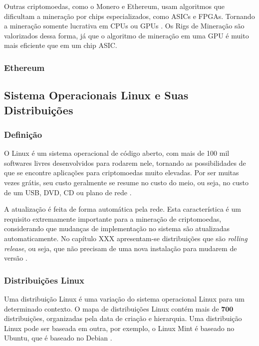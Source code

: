 \documentclass[
article,			%
12pt,				%
openright,			%
oneside,			%
a4paper,			%
chapter=TITLE,		%
section=TITLE,		%
subsection=TITLE,	%
subsubsection=TITLE,%
subsubsubsection=TITLE, %
english,			%
brazil,				%
]{abntex2}
\begin{document}
Outras criptomoedas, como o Monero e Ethereum, usam algoritmos que
dificultam a mineração por chips especializados, como ASICs e FPGAs.
Tornando a mineração somente lucrativa em CPUs ou GPUs
\cite{Weber2012}. Os Rigs de Mineração são valorizados dessa forma, já
que o algoritmo de mineração em uma GPU é muito mais eficiente que em
um chip ASIC\@.

\subsubsection{Ethereum}

\subsection{Sistema Operacionais Linux e Suas
Distribuições}\label{cap:sistemas-linux}

\subsubsection{Definição}

O Linux é um sistema operacional de código aberto, com mais de 100 mil
softwares livres desenvolvidos para rodarem nele, tornando as
possibilidades de que se encontre aplicações para criptomoedas muito
elevadas. Por ser muitas vezes grátis, seu custo geralmente se resume
no custo do meio, ou seja, no custo de um USB, DVD, CD ou plano de
rede \cite{Nunes2009}.

A atualização é feita de forma automática pela rede. Esta
característica é um requisito extremamente importante para a mineração
de criptomoedas, considerando que mudanças de implementação no sistema
são atualizadas automaticamente. No capítulo XXX apresentam-se
distribuições que são \emph{rolling release}, ou seja, que não
precisam de uma nova instalação para mudarem de versão
\cite{Nunes2009, ArchWiki2018a}.

\subsubsection{Distribuições Linux}

Uma distribuição Linux é uma variação do sistema operacional Linux
para um determinado contexto. O mapa de distribuições Linux contém
mais de $\mathbf{700}$ distribuições, organizadas pela data de criação
e hierarquia. Uma distribuição Linux pode ser baseada em outra, por
exemplo, o Linux Mint é baseado no Ubuntu, que é baseado no Debian
\cite{Loli2017}.
\end{document}
